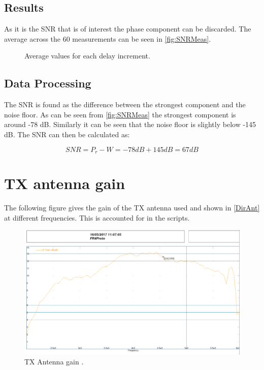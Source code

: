 \subsection{Results}
As it is the SNR that is of interest the phase component can be discarded. The average across the 60 measurements can be seen in \autoref{fig:SNRMeas}.

\begin{figure}[H]
\centering

\caption{Average values for each delay increment.}
\label{fig:SNRMeas}
\end{figure}

\subsection{Data Processing}
The SNR is found as the difference between the strongest component and the noise floor. As can be seen from \autoref{fig:SNRMeas} the strongest component is around -78 dB. Similarly it can be seen that the noise floor is slightly below -145 dB. The SNR can then be calculated as:

\begin{equation}
SNR = P_r - W = -78dB + 145dB = 67 dB
\end{equation}
\begin{where}
\end{where}

\section{TX antenna gain}
\label{ant_adix}
The following figure gives the gain of the TX antenna used and shown in \autoref{DirAnt} at different frequencies. This is accounted for in the scripts. 

\begin{figure}[H]
\centering
\includegraphics[width=1\textwidth]{figures/Fr4Proto1Gain.png}
\caption{TX Antenna gain \citep{TX_antenna}.}
\label{fig:TX_gain}
\end{figure}